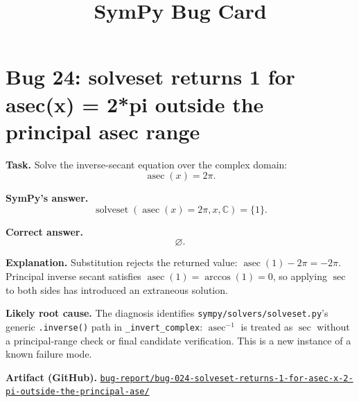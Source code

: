 \documentclass[11pt]{article}
\title{SymPy Bug Card}
\author{}
\date{}
\newcommand{\artifactrepo}{https://github.com/TODO-org/TODO-repo}
\newcommand{\bugbundle}[1]{\href{\artifactrepo/tree/main/bug-report/#1}{\nolinkurl{bug-report/#1/}}}
\begin{document}
\maketitle

\section*{Bug 24: solveset returns 1 for asec(x) = 2*pi outside the principal asec range}

\begin{counterexamplebox}
\textbf{Task.} Solve the inverse-secant equation over the complex domain:
\[
  \operatorname{asec}(x) = 2\pi .
\]

\medskip
\textbf{SymPy's answer.}
\[
  \operatorname{solveset}(\operatorname{asec}(x)=2\pi, x, \mathbb{C})
  = \{1\}.
\]

\medskip
\textbf{Correct answer.}
\[
  \varnothing .
\]

\medskip
\textbf{Explanation.} Substitution rejects the returned value:
\(\operatorname{asec}(1)-2\pi=-2\pi\).  Principal inverse secant satisfies
\(\operatorname{asec}(1)=\arccos(1)=0\), so applying \(\sec\) to both sides has
introduced an extraneous solution.

\medskip
\textbf{Likely root cause.} The diagnosis identifies
\nolinkurl{sympy/solvers/solveset.py}'s generic \texttt{.inverse()} path in
\texttt{\_invert\_complex}: \(\operatorname{asec}^{-1}\) is treated as \(\sec\)
without a principal-range check or final candidate verification.  This is a new
instance of a known failure mode.

\medskip
\textbf{Artifact (GitHub).} \bugbundle{bug-024-solveset-returns-1-for-asec-x-2-pi-outside-the-principal-ase}
\end{counterexamplebox}
\end{document}
